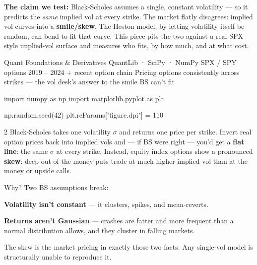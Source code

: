 \documentclass{pyportfolios-note}
\begin{document}
\thispagestyle{notecover}




\textbf{The claim we test:} Black-Scholes assumes a single, constant volatility
— so it predicts the \textit{same} implied vol at every strike. The market
flatly disagrees: implied vol curves into a \textbf{smile/skew}. The Heston
model, by letting volatility itself be random, can bend to fit that curve. This
piece pits the two against a real SPX-style implied-vol surface and measures who
fits, by how much, and at what cost.

\notecard
  {Quant Foundations \& Derivatives}
  {QuantLib · SciPy · NumPy}
  {SPX / SPY options}
  {2019 – 2024 + recent option chain}
  {Pricing options consistently across strikes — the vol desk's answer to the
   smile BS can't fit}

\begin{notecode}
import numpy as np
import matplotlib.pyplot as plt

np.random.seed(42)
plt.rcParams["figure.dpi"] = 110
\end{notecode}

\noteneedroom{170bp}

\begin{multicols}{2}
Black-Scholes takes one volatility $\sigma$ and returns one price per strike.
Invert real option prices back into implied vols and — if BS were right — you'd
get a \textbf{flat line}: the same $\sigma$ at every strike. Instead, equity
index options show a pronounced \textbf{skew}: deep out-of-the-money puts trade
at much higher implied vol than at-the-money or upside calls.

Why? Two BS assumptions break:

\begin{notebullets}
\item \textbf{Volatility isn't constant} — it clusters, spikes, and
      mean-reverts.
\item \textbf{Returns aren't Gaussian} — crashes are fatter and more frequent
      than a normal distribution allows, and they cluster in falling markets.
\end{notebullets}

The skew is the market pricing in exactly those two facts. Any single-vol model
is structurally unable to reproduce it.
\end{multicols}
\end{document}
